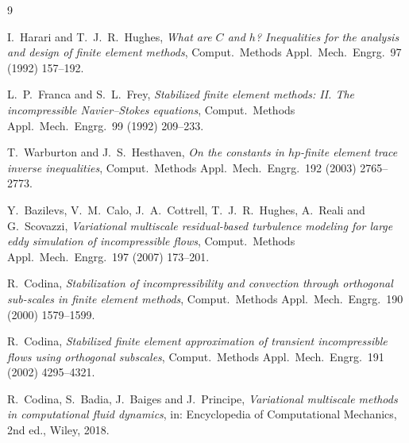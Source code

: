 \documentclass[11pt,a4paper]{article}
\theoremstyle{remark}
\begin{document}
\begin{thebibliography}{9}

I.~Harari and T.~J.~R.~Hughes,
\emph{What are $C$ and $h$? Inequalities for the analysis and design
of finite element methods},
Comput.\ Methods Appl.\ Mech.\ Engrg.\ 97 (1992) 157--192.

L.~P.~Franca and S.~L.~Frey,
\emph{Stabilized finite element methods: II. The incompressible
Navier--Stokes equations},
Comput.\ Methods Appl.\ Mech.\ Engrg.\ 99 (1992) 209--233.

T.~Warburton and J.~S.~Hesthaven,
\emph{On the constants in $hp$-finite element trace inverse
inequalities},
Comput.\ Methods Appl.\ Mech.\ Engrg.\ 192 (2003) 2765--2773.

Y.~Bazilevs, V.~M.~Calo, J.~A.~Cottrell, T.~J.~R.~Hughes, A.~Reali and
G.~Scovazzi,
\emph{Variational multiscale residual-based turbulence modeling for
large eddy simulation of incompressible flows},
Comput.\ Methods Appl.\ Mech.\ Engrg.\ 197 (2007) 173--201.

R.~Codina,
\emph{Stabilization of incompressibility and convection through
orthogonal sub-scales in finite element methods},
Comput.\ Methods Appl.\ Mech.\ Engrg.\ 190 (2000) 1579--1599.

R.~Codina,
\emph{Stabilized finite element approximation of transient
incompressible flows using orthogonal subscales},
Comput.\ Methods Appl.\ Mech.\ Engrg.\ 191 (2002) 4295--4321.

R.~Codina, S.~Badia, J.~Baiges and J.~Principe,
\emph{Variational multiscale methods in computational fluid dynamics},
in: Encyclopedia of Computational Mechanics, 2nd ed., Wiley, 2018.

\end{thebibliography}
\end{document}
